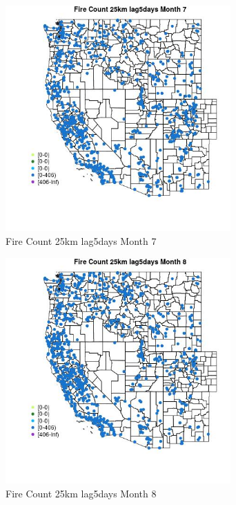 \begin{figure} 
\centering  
\includegraphics[width=0.77\textwidth]{Code_Outputs/Report_ML_input_PM25_Step4_part_f_de_duplicated_aves_prioritize_24hr_obswNAs_MapObsMo7Fire_Count_25km_lag5days.jpg} 
\caption{\label{fig:Report_ML_input_PM25_Step4_part_f_de_duplicated_aves_prioritize_24hr_obswNAsMapObsMo7Fire_Count_25km_lag5days}Fire Count 25km lag5days Month 7} 
\end{figure} 
 

\clearpage 

\begin{figure} 
\centering  
\includegraphics[width=0.77\textwidth]{Code_Outputs/Report_ML_input_PM25_Step4_part_f_de_duplicated_aves_prioritize_24hr_obswNAs_MapObsMo8Fire_Count_25km_lag5days.jpg} 
\caption{\label{fig:Report_ML_input_PM25_Step4_part_f_de_duplicated_aves_prioritize_24hr_obswNAsMapObsMo8Fire_Count_25km_lag5days}Fire Count 25km lag5days Month 8} 
\end{figure} 
 

